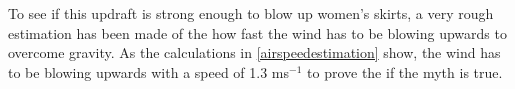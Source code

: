 To see if this updraft is strong enough to blow up women's skirts, a very rough estimation has been made of the how fast the wind has to be blowing upwards to overcome gravity. As the calculations in \autoref{airspeedestimation} show, the wind has to be blowing upwards with a speed of 1.3 ms$^{-1}$ to prove the if the myth is true.